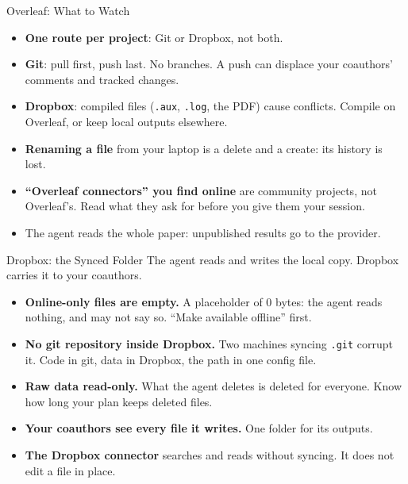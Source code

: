 \documentclass[svgnames,x11names,dvipsnames]{beamer}
\newcommand{\chg}[1]{{\bfseries #1}}
\renewcommand{\chg}[1]{#1}
\begin{document}
\begin{frame}{\chg{Overleaf: What to Watch}}
\small
\begin{itemize}
    \setlength{\itemsep}{6pt}
    \item \textbf{One route per project}: Git or Dropbox, not both.
    \item \textbf{Git}: pull first, push last. No branches. A push can displace your coauthors' comments and tracked changes.
    \item \textbf{Dropbox}: compiled files (\texttt{.aux}, \texttt{.log}, the PDF) cause conflicts. Compile on Overleaf, or keep local outputs elsewhere.
    \item \textbf{Renaming a file} from your laptop is a delete and a create: its history is lost.
    \item \textbf{``Overleaf connectors'' you find online} are community projects, not Overleaf's. Read what they ask for before you give them your session.
    \item The agent reads the whole paper: unpublished results go to the provider.
\end{itemize}
\end{frame}

\begin{frame}{\chg{Dropbox: the Synced Folder}}
\small
The agent reads and writes the local copy. Dropbox carries it to your coauthors.

\vspace{0.3cm}
\begin{itemize}
    \setlength{\itemsep}{6pt}
    \item \textbf{Online-only files are empty.} A placeholder of 0 bytes: the agent reads nothing, and may not say so. ``Make available offline'' first.
    \item \textbf{No git repository inside Dropbox.} Two machines syncing \texttt{.git} corrupt it. Code in git, data in Dropbox, the path in one config file.
    \item \textbf{Raw data read-only.} What the agent deletes is deleted for everyone. Know how long your plan keeps deleted files.
    \item \textbf{Your coauthors see every file it writes.} One folder for its outputs.
    \item \textbf{The Dropbox connector} searches and reads without syncing. It does not edit a file in place.
\end{itemize}
\end{frame}
\end{document}
